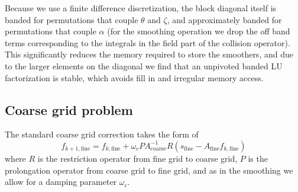 \documentclass[11pt]{article}
\begin{document}
Because we use a finite difference discretization, the block diagonal itself is
banded for permutations that couple $\theta$ and $\zeta$, and approximately
banded for permutations that couple $\alpha$ (for the smoothing operation we
drop the off band terms corresponding to the integrals in the field part of the
collision operator). This significantly reduces the memory required to store the
smoothers, and due to the larger elements on the diagonal we find that an
unpivoted banded LU factorization is stable, which avoids fill in and irregular
memory access.

\subsection{Coarse grid problem}
\label{sec:coarse}

The standard coarse grid correction takes the form of
\begin{equation}
f_{k+1, \mathrm{fine}} = f_{k, \mathrm{fine}}
+ \omega_c P A^{-1}_{\mathrm{coarse}} R
(s_{\mathrm{fine}} - A_{\mathrm{fine}} f_{k, \mathrm{fine}})
\end{equation}
where $R$ is the restriction operator from fine grid to coarse grid, $P$ is the
prolongation operator from coarse grid to fine grid, and as in the smoothing we
allow for a damping parameter $\omega_c$.
\end{document}
